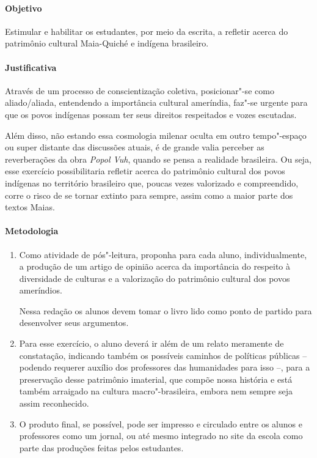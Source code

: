 \documentclass[11pt]{extarticle}
\begin{document}
\paragraph{Objetivo} Estimular e habilitar os estudantes, por meio da escrita, 
a refletir acerca do patrimônio cultural Maia-Quiché e indígena brasileiro.

\paragraph{Justificativa} Através de um processo de conscientização
coletiva, posicionar"-se como aliado/aliada, entendendo a importância cultural ameríndia, 
faz"-se urgente para que os povos indígenas possam ter seus direitos respeitados e vozes escutadas. 

Além disso, não estando essa cosmologia milenar oculta em outro tempo"-espaço ou super distante 
das discussões atuais, é de grande valia perceber as reverberações da obra \emph{Popol Vuh}, quando 
se pensa a realidade brasileira. Ou seja, esse exercício possibilitaria refletir acerca do
patrimônio cultural dos povos indígenas no território brasileiro que, poucas vezes valorizado e compreendido, 
corre o risco de se tornar extinto para sempre, assim como a maior
parte dos textos Maias.

\paragraph{Metodologia} 

\begin{enumerate}
\item
Como atividade de pós"-leitura, proponha para cada aluno, individualmente, a produção de um artigo 
de opinião acerca da importância do respeito à diversidade de culturas e a valorização do
patrimônio cultural dos povos ameríndios. 

Nessa redação os alunos devem tomar o
livro lido como ponto de partido para desenvolver seus argumentos. 

\item
Para esse exercício, o aluno deverá ir além de um relato meramente de
constatação, indicando também os possíveis caminhos de políticas públicas --
podendo requerer auxílio dos professores das humanidades para isso --,
para a preservação desse patrimônio imaterial, que compõe nossa história
e está também arraigado na cultura macro"-brasileira, embora nem sempre
seja assim reconhecido.

\item
O produto final, se possível, pode ser impresso e circulado entre os alunos e 
professores como um jornal, ou até mesmo integrado no site da escola como parte das 
produções feitas pelos estudantes. 

\end{enumerate}
\end{document}
